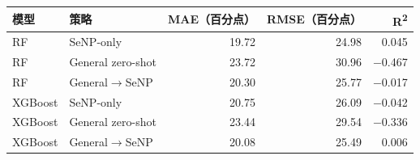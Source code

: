 \begin{tabular}{llrrr}
\toprule
模型 & 策略 & MAE（百分点） & RMSE（百分点） & R\textsuperscript{2} \\
\midrule
RF & SeNP-only & 19.72 & 24.98 & 0.045 \\
RF & General zero-shot & 23.72 & 30.96 & \ensuremath{\mathord{-}}0.467 \\
RF & General\ensuremath{\rightarrow}SeNP & 20.30 & 25.77 & \ensuremath{\mathord{-}}0.017 \\
XGBoost & SeNP-only & 20.75 & 26.09 & \ensuremath{\mathord{-}}0.042 \\
XGBoost & General zero-shot & 23.44 & 29.54 & \ensuremath{\mathord{-}}0.336 \\
XGBoost & General\ensuremath{\rightarrow}SeNP & 20.08 & 25.49 & 0.006 \\
\bottomrule
\end{tabular}
